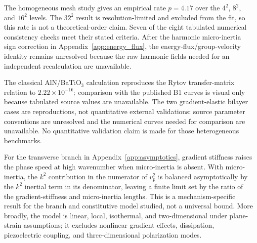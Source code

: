 The homogeneous mesh study gives an empirical rate $p=4.17$ over the $4^2$, $8^2$, and $16^2$ levels. The $32^2$ result is resolution-limited and excluded from the fit, so this rate is not a theoretical-order claim. Seven of the eight tabulated numerical consistency checks meet their stated criteria. After the harmonic micro-inertia sign correction in Appendix~\ref{app:energy_flux}, the energy-flux/group-velocity identity remains unresolved because the raw harmonic fields needed for an independent recalculation are unavailable.

The classical AlN/BaTiO$_3$ calculation reproduces the Rytov transfer-matrix relation to $2.22\times10^{-16}$; comparison with the published B1 curves is visual only because tabulated source values are unavailable. The two gradient-elastic bilayer cases are reproductions, not quantitative external validations: source parameter conventions are unresolved and the numerical curves needed for comparison are unavailable. No quantitative validation claim is made for those heterogeneous benchmarks.

For the transverse branch in Appendix~\ref{app:asymptotics}, gradient stiffness raises the phase speed at high wavenumber when micro-inertia is absent. With micro-inertia, the $k^2$ contribution in the numerator of $v_p^2$ is balanced asymptotically by the $k^2$ inertial term in its denominator, leaving a finite limit set by the ratio of the gradient-stiffness and micro-inertia lengths. This is a mechanism-specific result for the branch and constitutive model studied, not a universal bound. More broadly, the model is linear, local, isothermal, and two-dimensional under plane-strain assumptions; it excludes nonlinear gradient effects, dissipation, piezoelectric coupling, and three-dimensional polarization modes.
